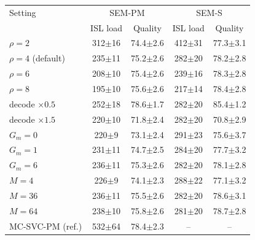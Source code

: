 \begin{tabular}{@{}lcccc@{}}
\toprule
Setting & \multicolumn{2}{c}{SEM-PM} & \multicolumn{2}{c}{SEM-S}\\
 & ISL load & Quality & ISL load & Quality\\
\midrule
$\rho=2$ & 312$\pm$16 & 74.4$\pm$2.6 & 412$\pm$31 & 77.3$\pm$3.1\\
$\rho=4$ (default) & 235$\pm$11 & 75.2$\pm$2.6 & 282$\pm$20 & 78.2$\pm$2.8\\
$\rho=6$ & 208$\pm$10 & 75.4$\pm$2.6 & 239$\pm$16 & 78.3$\pm$2.8\\
$\rho=8$ & 195$\pm$10 & 75.6$\pm$2.6 & 217$\pm$14 & 78.4$\pm$2.8\\
decode $\times0.5$ & 252$\pm$18 & 78.6$\pm$1.7 & 282$\pm$20 & 85.4$\pm$1.2\\
decode $\times1.5$ & 220$\pm$10 & 71.8$\pm$2.4 & 282$\pm$20 & 70.8$\pm$2.9\\
$G_m=0$ & 220$\pm$9 & 73.1$\pm$2.4 & 291$\pm$23 & 75.6$\pm$3.7\\
$G_m=1$ & 231$\pm$11 & 74.7$\pm$2.5 & 284$\pm$20 & 77.7$\pm$3.2\\
$G_m=6$ & 236$\pm$11 & 75.3$\pm$2.6 & 282$\pm$20 & 78.1$\pm$2.8\\
$M=4$ & 226$\pm$9 & 74.1$\pm$2.3 & 288$\pm$22 & 77.1$\pm$3.2\\
$M=36$ & 236$\pm$11 & 75.5$\pm$2.6 & 282$\pm$20 & 78.6$\pm$3.1\\
$M=64$ & 238$\pm$10 & 75.8$\pm$2.6 & 281$\pm$20 & 78.7$\pm$2.8\\
\midrule
MC-SVC-PM (ref.) & 532$\pm$64 & 78.4$\pm$2.3 & -- & --\\
\bottomrule
\end{tabular}
